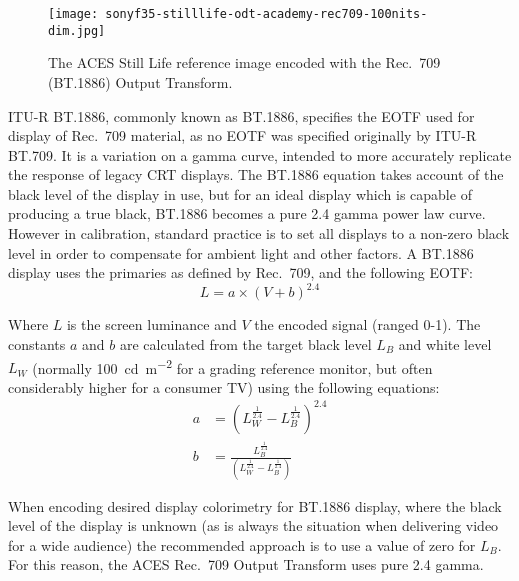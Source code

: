\begin{figure}[H]
    \texttt{[image: sonyf35-stilllife-odt-academy-rec709-100nits-dim.jpg]}
    \caption{
        The ACES Still Life reference image encoded with the Rec.~709 (BT.1886) Output Transform.\newline
        \ccCopyrightAmpas
    }%
    \label{fig:ODT-Academy-Rec709-100nits-dim}
\end{figure}

ITU-R BT.1886, commonly known as BT.1886, specifies the EOTF used for display of Rec.~709 material, as no EOTF was specified originally by ITU-R BT.709.
It is a variation on a gamma curve, intended to more accurately replicate the response of legacy CRT displays.
The BT.1886 equation takes account of the black level of the display in use, but for an ideal display which is capable of producing a true black, BT.1886 becomes a pure 2.4 gamma power law curve.
However in calibration, standard practice is to set all displays to a non-zero black level in order to compensate for ambient light and other factors.
\ccPar{}
A BT.1886 display uses the primaries as defined by Rec.~709, and the following EOTF:
\begin{equation}
    L = a \times (V + b)^{2.4}
\end{equation}

Where \(L\) is the screen luminance and \(V\) the encoded signal (ranged 0-1).
The constants \(a\) and \(b\) are calculated from the target black level \(L_B\) and white level \(L_W\) (normally \SI{100}{\candela\per\metre\squared} for a grading reference monitor, but often considerably higher for a consumer TV) using the following equations:
\begin{align}
    a &= (L_W^{\frac{1}{2.4}} - L_B^{\frac{1}{2.4}})^{2.4} \nonumber \\
    b &= \frac{L_B^{\frac{1}{2.4}}}{(L_W^{\frac{1}{2.4}} - L_B^{\frac{1}{2.4}})} \nonumber
\end{align}

\begin{figure}[H]
    \label{fig:bt1886}
\end{figure}

When encoding desired display colorimetry for BT.1886 display, where the black level of the display is unknown (as is always the situation when delivering video for a wide audience) the recommended approach is to use a value of zero for \(L_B\).
For this reason, the ACES Rec.~709 Output Transform uses pure 2.4 gamma.


